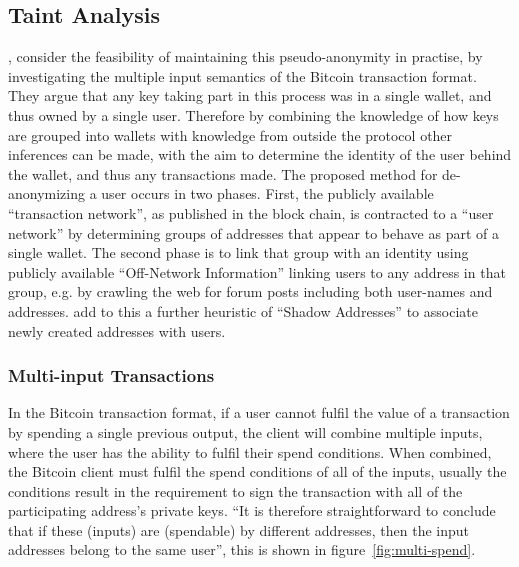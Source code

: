 \subsection{Taint Analysis}
\textcite{reid-anon}, consider the feasibility of maintaining this pseudo-anonymity in practise, by investigating the multiple input semantics of the Bitcoin transaction format. They argue that any key taking part in this process was in a single wallet, and thus owned by a single user. Therefore by combining the knowledge of how keys are grouped into wallets with knowledge from outside the protocol other inferences can be made, with the aim to determine the identity of the user behind the wallet, and thus any transactions made.  The proposed method for de-anonymizing a user occurs in two phases.  First, the publicly available ``transaction network'', as published in the block chain, is contracted to a ``user network'' by determining groups of addresses that appear to behave as part of a single wallet.  The second phase is to link that group with an identity using publicly available ``Off-Network Information'' linking users to any address in that group, e.g. by crawling the web for forum posts including both user-names and addresses.  \textcite{eval-priv} add to this a further heuristic of ``Shadow Addresses'' to associate newly created addresses with users.

\subsubsection{Multi-input Transactions}
In the Bitcoin transaction format, if a user cannot fulfil the value of a transaction by spending a single previous output, the client will combine multiple inputs, where the user has the ability to fulfil their spend conditions.  When combined, the Bitcoin client must fulfil the spend conditions of all of the inputs, usually the conditions result in the requirement to sign the transaction with all of the participating address's private keys.  ``It is therefore straightforward to conclude that if these (inputs) are (spendable) by different addresses, then the input addresses belong to the same user''\cite{eval-priv}, this is shown in figure~\ref{fig:multi-spend}.

